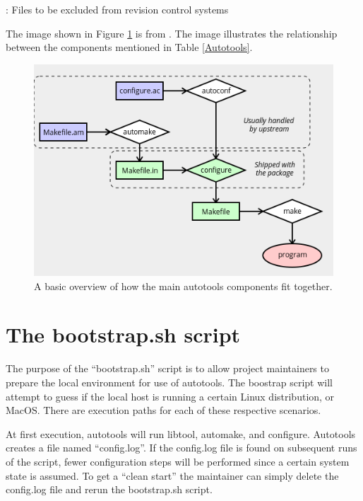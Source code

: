 \begin{mybox}[ht]{\thetcbcounter: Files to be excluded from revision control systems}
    
\end{mybox}
\vspace{2mm}



\justifying
The image shown in Figure \ref{diagram} is from \cite{autobasics}.
The image illustrates the relationship between the components mentioned in Table \ref{Autotools}.
\vspace{2mm}

\begin{figure}[ht]
    \includegraphics[width=12cm]{images/diagram.png}
    \caption{A basic overview of how the main autotools components fit together.}
    \label{diagram}
\end{figure}
\vspace{2mm}

\section{\label{sec:bootstrap}The bootstrap.sh script}

The purpose of the ``bootstrap.sh'' script is to allow project maintainers to prepare the local environment for use of autotools.
The boostrap script will attempt to guess if the local host is running a certain Linux distribution, or MacOS. There are execution
paths for each of these respective scenarios.

At first execution, autotools will run libtool, automake, and configure. Autotools creates a file named ``config.log''. If the config.log
file is found on subsequent runs of the script, fewer configuration steps will be performed since a certain system state is assumed. To
get a ``clean start'' the maintainer can simply delete the config.log file and rerun the bootstrap.sh script.

